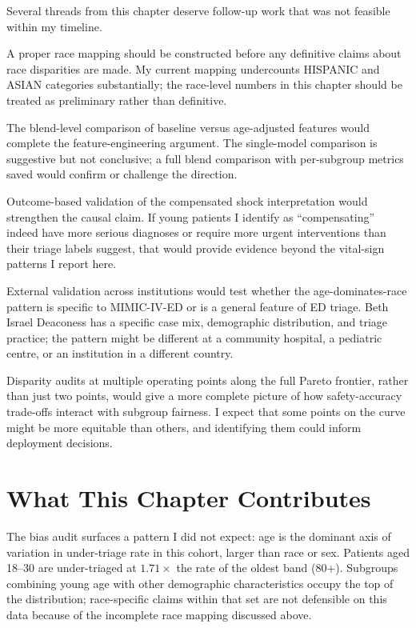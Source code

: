 Several threads from this chapter deserve follow-up work that was not feasible within my timeline.

A proper race mapping should be constructed before any definitive claims about race disparities are made. My current mapping undercounts HISPANIC and ASIAN categories substantially; the race-level numbers in this chapter should be treated as preliminary rather than definitive.

The blend-level comparison of baseline versus age-adjusted features would complete the feature-engineering argument. The single-model comparison is suggestive but not conclusive; a full blend comparison with per-subgroup metrics saved would confirm or challenge the direction.

Outcome-based validation of the compensated shock interpretation would strengthen the causal claim. If young patients I identify as ``compensating'' indeed have more serious diagnoses or require more urgent interventions than their triage labels suggest, that would provide evidence beyond the vital-sign patterns I report here.

External validation across institutions would test whether the age-dominates-race pattern is specific to MIMIC-IV-ED or is a general feature of ED triage. Beth Israel Deaconess has a specific case mix, demographic distribution, and triage practice; the pattern might be different at a community hospital, a pediatric centre, or an institution in a different country.

Disparity audits at multiple operating points along the full Pareto frontier, rather than just two points, would give a more complete picture of how safety-accuracy trade-offs interact with subgroup fairness. I expect that some points on the curve might be more equitable than others, and identifying them could inform deployment decisions.

\section{What This Chapter Contributes}

The bias audit surfaces a pattern I did not expect: age is the dominant axis of variation in under-triage rate in this cohort, larger than race or sex. Patients aged 18--30 are under-triaged at $1.71\times$ the rate of the oldest band (80+). Subgroups combining young age with other demographic characteristics occupy the top of the distribution; race-specific claims within that set are not defensible on this data because of the incomplete race mapping discussed above.

